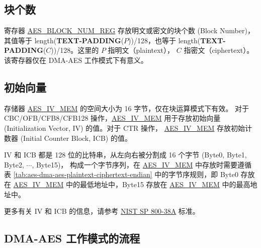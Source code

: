 \documentclass[main\_\_CN.tex]{subfiles}
\begin{document}
\subsection{块个数}\label{sec:aes-block-number}

寄存器 \hyperref[regdesc:AESBLOCKNUMREG]{AES\_BLOCK\_NUM\_REG} 存放明文或密文的块个数 (Block Number)，其值等于 length({\bfseries TEXT-PADDING}($P$))/128，也等于 length({\bfseries TEXT-PADDING}($C$))/128。这里的 $P$ 指明文（plaintext）， $C$ 指密文（ciphertext）。该寄存器仅在 DMA-AES 工作模式下有意义。

\subsection{初始向量}\label{sec:aes-init-vector}

\label{memdesc:AESIVMEM}存储器 \hyperref[memdesc:AESIVMEM]{AES\_IV\_MEM} 的空间大小为 16 字节，仅在块运算模式下有效。
对于 CBC/OFB/CFB8/CFB128 操作，\hyperref[memdesc:AESIVMEM]{AES\_IV\_MEM} 用于存放初始向量 (Initialization Vector, IV) 的值。对于 CTR 操作， \hyperref[memdesc:AESIVMEM]{AES\_IV\_MEM}  存放初始计数器 (Initial Counter Block, ICB) 的值。

IV 和 ICB 都是 128 位的比特串，从左向右被分割成 16 个字节 (Byte0, Byte1, Byte2, \begin{math}\cdots\end{math}, Byte15)， 构成一个字节序列，在 \hyperref[memdesc:AESIVMEM]{AES\_IV\_MEM} 中存放时需要遵循表 \ref{tab:aes-dma-aes-plaintext-ciphertext-endian} 中的字节序规则，即 Byte0 存放在 \hyperref[memdesc:AESIVMEM]{AES\_IV\_MEM} 中的最低地址中，Byte15 存放在 \hyperref[memdesc:AESIVMEM]{AES\_IV\_MEM} 中的最高地址中。

更多有关 IV 和 ICB 的信息，请参考 \href{https://nvlpubs.nist.gov/nistpubs/Legacy/SP/nistspecialpublication800-38a.pdf}{NIST SP 800-38A} 标准。

\subsection{DMA-AES 工作模式的流程 }
\end{document}
